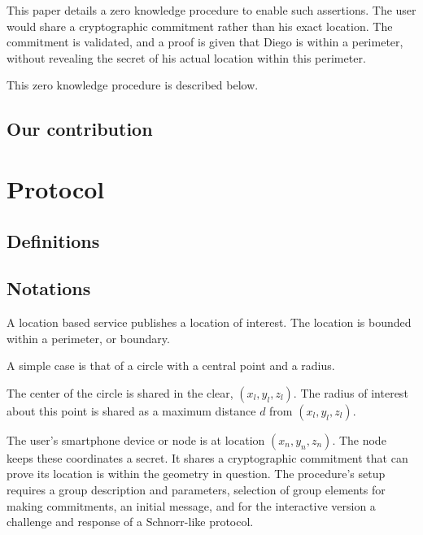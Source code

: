 \documentclass{article}
\begin{document}
This paper details a zero knowledge procedure to enable such assertions. 
The user would share a cryptographic commitment rather than his exact location. 
The commitment is validated, 
and a proof is given that Diego is within a perimeter, 
without revealing the secret of his actual location within this perimeter. 

This zero knowledge procedure is described below. 

\subsection{Our contribution}

\section{Protocol}
\subsection{Definitions}


\subsection{Notations}

A location based service publishes a location of interest. 
The location is bounded within a perimeter, or boundary. 

A simple case is that of a circle with a central point and a radius. 

The center of the circle is shared in the clear, $(x_l, y_l, z_l)$. 
The radius of interest about this point is shared as a maximum distance $d$ from $(x_l, y_l, z_l)$. 

The user's smartphone device or node is at location $(x_n, y_n, z_n )$. 
The node keeps these coordinates a secret. 
It shares a cryptographic commitment that can prove its location is within the geometry in question. 
The procedure's setup requires a group description and parameters, selection of group elements for making commitments,
an initial message, and for the interactive version a challenge and response of a Schnorr-like protocol.
\end{document}
